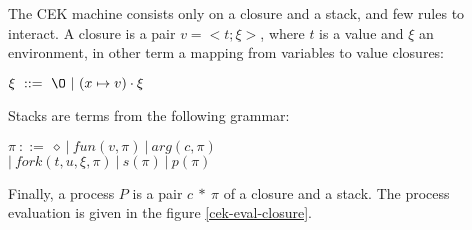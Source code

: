 \documentclass[a4paper,12pt]{report}
\begin{document}
The CEK machine consists only on a closure and a stack, and few rules to
interact. A closure is a pair $v =<t;\xi>$, where $t$ is a value and $\xi$
an environment, in other term a mapping from variables to value closures:

\begin{center}
  $\xi ~ ::=~\O~|~(x \mapsto v) \cdot \xi$
\end{center}

Stacks are terms from the following grammar:

\begin{center}
  $\pi~::=~\diamond~|~fun(v, \pi)~|~arg(c, \pi)$ \\
  $|~fork(t,u,\xi,\pi)~|~s(\pi)~|~p(\pi)$
\end{center}

Finally, a process $P$ is a pair $c~*~\pi$ of a closure and a stack. The process
evaluation is given in the figure \ref{cek-eval-closure}.
\end{document}
